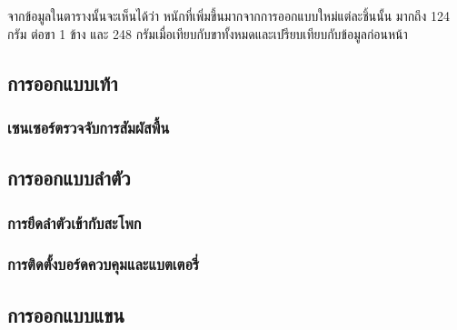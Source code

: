 จากข้อมูลในตารางนั้นจะเห็นได้ว่า หนักที่เพิ่มขึ้นมากจากการออกแบบใหม่แต่ละชิ้นนั้น มากถึง 124 กรัม
ต่อขา 1 ข้าง และ 248 กรัมเมื่อเทียบกับขาทั้งหมดและเปรียบเทียบกับข้อมูลก่อนหน้า



\subsection{การออกแบบเท้า}
\subsubsection{เซนเซอร์ตรวจจับการสัมผัสพื้น}

\subsection{การออกแบบลำตัว}
\subsubsection{การยึดลำตัวเข้ากับสะโพก}
\subsubsection{การติดตั้งบอร์ดควบคุมและแบตเตอรี่}

\subsection{การออกแบบแขน}



